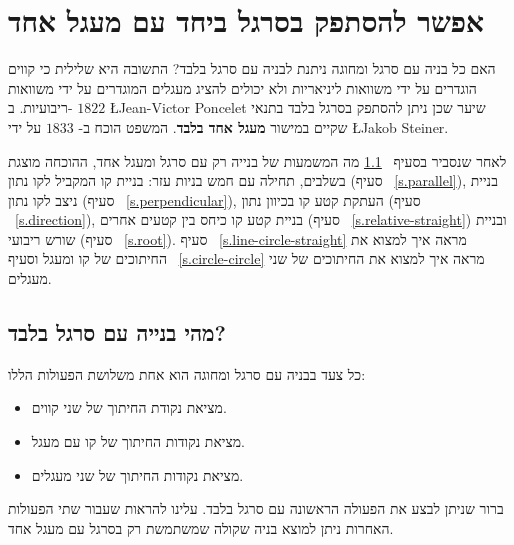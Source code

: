
\chapter{אפשר להסתפק בסרגל ביחד עם מעגל אחד}\label{c.straightedge}


האם כל בניה עם סרגל ומחוגה ניתנת לבניה עם סרגל בלבד? התשובה היא שלילית כי קווים הוגדרים על ידי משוואות ליניאריות ולא יכולים להציג מעגלים המוגדרים על ידי משוואות ריבועיות. ב-%
$1822$
\L{Jean-Victor Poncelet}
שיער שכן ניתן להסתפק בסרגל בלבד בתנאי שקיים במישור 
\textbf{מעגל אחד בלבד}.
המשפט הוכח ב-%
$1833$
על ידי
\L{Jakob Steiner}.

לאחר שנסביר בסעיף%
~\ref{s.se-what}
מה המשמעות של בנייה רק עם סרגל ומעגל אחד, ההוכחה מוצגת בשלבים, תחילה עם חמש בניות עזר: בניית קו המקביל לקו נתון (סעיף%
~\ref{s.parallel}),
בניית ניצב לקו נתון (סעיף%
~\ref{s.perpendicular}),
העתקת קטע קו בכיוון נתון (סעיף%
~\ref{s.direction}), 
בניית קטע קו כיחס בין קטעים אחרים (סעיף%
~\ref{s.relative-straight})
ובניית שורש ריבועי (סעיף%
~\ref{s.root}).
סעיף%
~\ref{s.line-circle-straight}
מראה איך למצוא את החיתוכים של קו ומעגל וסעיף%
~\ref{s.circle-circle}
מראה איך למצוא את החיתוכים של שני מעגלים.


\section{מהי בנייה עם סרגל בלבד?}\label{s.se-what}

כל צעד בבניה עם סרגל ומחוגה הוא אחת משלושת הפעולות הללו:
\begin{itemize}
\setlength{\itemsep}{0pt}
\item
מציאת נקודת החיתוך של שני קווים.
\item
מציאת נקודות החיתוך של קו עם מעגל.
\item
מציאת נקודות החיתוך של שני מעגלים.
\end{itemize}
ברור שניתן לבצע את הפעולה הראשונה עם סרגל בלבד. עלינו להראות שעבור שתי הפעולות האחרות ניתן למוצא בניה שקולה שמשתמשת רק בסרגל עם מעגל אחד.


